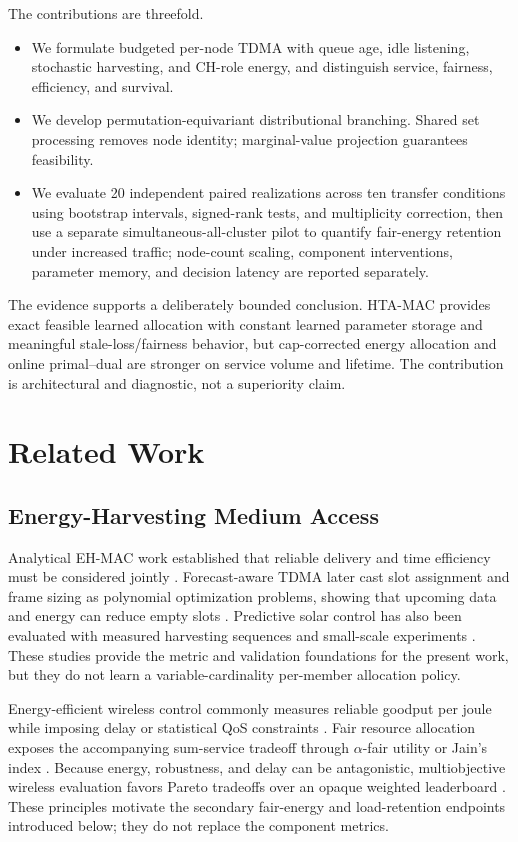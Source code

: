 \documentclass[journal]{IEEEtran}
\newcommand{\method}{HTA-MAC}
\begin{document}
The contributions are threefold.

\begin{itemize}
\item We formulate budgeted per-node TDMA with queue age, idle listening,
stochastic harvesting, and CH-role energy, and distinguish service, fairness,
efficiency, and survival.
\item We develop permutation-equivariant distributional branching. Shared set
processing removes node identity; marginal-value projection guarantees
feasibility.
\item We evaluate 20 independent paired realizations across ten transfer
conditions using bootstrap intervals, signed-rank tests, and multiplicity
correction, then use a separate simultaneous-all-cluster pilot to quantify
fair-energy retention under increased traffic; node-count scaling, component
interventions, parameter memory, and decision latency are reported separately.
\end{itemize}

The evidence supports a deliberately bounded conclusion. \method{} provides
exact feasible learned allocation with constant learned parameter storage and
meaningful stale-loss/fairness behavior, but cap-corrected energy allocation
and online primal--dual are stronger on service volume and lifetime. The
contribution is architectural and diagnostic, not a superiority claim.

\section{Related Work}

\subsection{Energy-Harvesting Medium Access}

Analytical EH-MAC work established that reliable delivery and time efficiency
must be considered jointly \cite{iannello2012ehmac}. Forecast-aware TDMA later
cast slot assignment and frame sizing as polynomial optimization problems,
showing that upcoming data and energy can reduce empty slots
\cite{gong2021ffss}. Predictive solar control has also been evaluated with
measured harvesting sequences and small-scale experiments
\cite{zou2016predictive}. These studies provide the metric and validation
foundations for the present work, but they do not learn a variable-cardinality
per-member allocation policy.

Energy-efficient wireless control commonly measures reliable goodput per
joule while imposing delay or statistical QoS constraints
\cite{meshkati2007energy,gao2017statistical}. Fair resource allocation exposes
the accompanying sum-service tradeoff through $\alpha$-fair utility or Jain's
index \cite{yang2018fairness,jain1984fairness}. Because energy, robustness,
and delay can be antagonistic, multiobjective wireless evaluation favors
Pareto tradeoffs over an opaque weighted leaderboard
\cite{jaffres2010multiobjective}. These principles motivate the secondary
fair-energy and load-retention endpoints introduced below; they do not replace
the component metrics.
\end{document}
